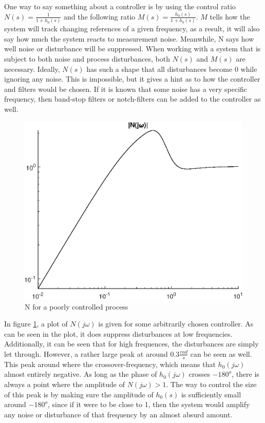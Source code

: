 One way to say something about a controller is by using the control ratio $N(s) = \frac{1}{1 + h_0(s)}$ and the following ratio $M(s) = \frac{h_0(s)}{1 + h_0(s)}$. $M$ tells how the system will track changing references of a given frequency, as a result, it will also say how much the system reacts to measurement noise. Meanwhile, N says how well noise or disturbance will be suppressed. When working with a system that is subject to both noise and process disturbances, both $N(s)$ and $M(s)$ are necessary. Ideally, $N(s)$ has such a shape that all disturbances become 0 while ignoring any noise. This is impossible, but it gives a hint as to how the controller and filters would be chosen. If it is known that some noise has a very specific frequency, then band-stop filters or notch-filters can be added to the controller as well. 
\begin{figure}[!ht]
    \includegraphics[width=\textwidth]{img/Fig_dump/Generic_N_plot.eps}
    \caption{N for a poorly controlled process}
    \label{fig:N_plot}
\end{figure}


\noindent
In figure \ref{fig:N_plot}, a plot of $N(j\omega)$ is given for some arbitrarily chosen controller. As can be seen in the plot, it does suppress disturbances at low frequencies. Additionally, it can be seen that for high frequences, the disturbances are simply let through. However, a rather large peak at around $0.3  \frac{rad}{s}$ can be seen as well. This peak around where the crossover-frequency, which means that $h_0(j\omega)$ almost entirely negative. As long as the phase of $h_0(j \omega)$ crosses $-180^o$, there is always a point where the amplitude of $N(j \omega) > 1$. The way to control the size of this peak is by making sure the amplitude of $h_0(s)$ is sufficiently small around $-180^o$, since if it were to be close to 1, then the system would amplify any noise or disturbance of that frequency by an almost absurd amount.


